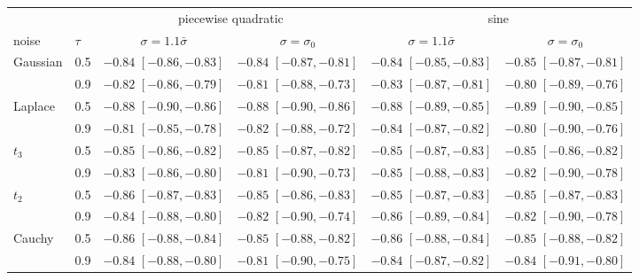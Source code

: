 \begin{tabular}{llcccc}
\toprule
 & & \multicolumn{2}{c}{piecewise quadratic} & \multicolumn{2}{c}{sine} \\
\cmidrule(lr){3-4}\cmidrule(lr){5-6}
noise & $\tau$ & $\sigma = 1.1\bar\sigma$ & $\sigma = \sigma_0$ & $\sigma = 1.1\bar\sigma$ & $\sigma = \sigma_0$ \\
\midrule
Gaussian & 0.5 & $-0.84$ {\scriptsize $[-0.86, -0.83]$} & $-0.84$ {\scriptsize $[-0.87, -0.81]$} & $-0.84$ {\scriptsize $[-0.85, -0.83]$} & $-0.85$ {\scriptsize $[-0.87, -0.81]$} \\
 & 0.9 & $-0.82$ {\scriptsize $[-0.86, -0.79]$} & $-0.81$ {\scriptsize $[-0.88, -0.73]$} & $-0.83$ {\scriptsize $[-0.87, -0.81]$} & $-0.80$ {\scriptsize $[-0.89, -0.76]$} \\
Laplace & 0.5 & $-0.88$ {\scriptsize $[-0.90, -0.86]$} & $-0.88$ {\scriptsize $[-0.90, -0.86]$} & $-0.88$ {\scriptsize $[-0.89, -0.85]$} & $-0.89$ {\scriptsize $[-0.90, -0.85]$} \\
 & 0.9 & $-0.81$ {\scriptsize $[-0.85, -0.78]$} & $-0.82$ {\scriptsize $[-0.88, -0.72]$} & $-0.84$ {\scriptsize $[-0.87, -0.82]$} & $-0.80$ {\scriptsize $[-0.90, -0.76]$} \\
$t_3$ & 0.5 & $-0.85$ {\scriptsize $[-0.86, -0.82]$} & $-0.85$ {\scriptsize $[-0.87, -0.82]$} & $-0.85$ {\scriptsize $[-0.87, -0.83]$} & $-0.85$ {\scriptsize $[-0.86, -0.82]$} \\
 & 0.9 & $-0.83$ {\scriptsize $[-0.86, -0.80]$} & $-0.81$ {\scriptsize $[-0.90, -0.73]$} & $-0.85$ {\scriptsize $[-0.88, -0.83]$} & $-0.82$ {\scriptsize $[-0.90, -0.78]$} \\
$t_2$ & 0.5 & $-0.86$ {\scriptsize $[-0.87, -0.83]$} & $-0.85$ {\scriptsize $[-0.86, -0.83]$} & $-0.85$ {\scriptsize $[-0.87, -0.83]$} & $-0.85$ {\scriptsize $[-0.87, -0.83]$} \\
 & 0.9 & $-0.84$ {\scriptsize $[-0.88, -0.80]$} & $-0.82$ {\scriptsize $[-0.90, -0.74]$} & $-0.86$ {\scriptsize $[-0.89, -0.84]$} & $-0.82$ {\scriptsize $[-0.90, -0.78]$} \\
Cauchy & 0.5 & $-0.86$ {\scriptsize $[-0.88, -0.84]$} & $-0.85$ {\scriptsize $[-0.88, -0.82]$} & $-0.86$ {\scriptsize $[-0.88, -0.84]$} & $-0.85$ {\scriptsize $[-0.88, -0.82]$} \\
 & 0.9 & $-0.84$ {\scriptsize $[-0.88, -0.80]$} & $-0.81$ {\scriptsize $[-0.90, -0.75]$} & $-0.84$ {\scriptsize $[-0.87, -0.82]$} & $-0.84$ {\scriptsize $[-0.91, -0.80]$} \\
\bottomrule
\end{tabular}
